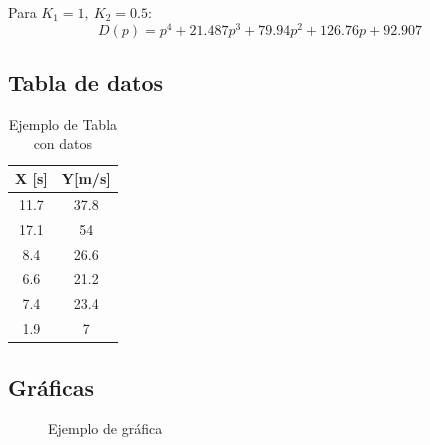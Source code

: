 \documentclass[article, 11pt]{IEEEtran}   %
\begin{document}
Para $K_1=1,\ K_2=0.5$:
\begin{equation*}
D(p)=p^4+21.487p^3+79.94p^2+126.76p+92.907
\end{equation*}


\subsection{Tabla de datos}
\begin{table}[H]
\centering
\caption{Ejemplo de Tabla con datos}
\label{DataTable1}
\begin{tabular}{|c|c|}
\hline
X [s] & Y[m/s]  \\
\hline
11.7 & 37.8              \\
17.1 & 54     \\  
8.4 & 26.6 \\
6.6 & 21.2 \\
7.4 & 23.4 \\
1.9 & 7   \\
\hline   
\end{tabular}
\end{table}

\subsection{Gr\'aficas}
\begin{figure}[H]
	\centering
	\caption{Ejemplo de gr\'afica}\label{diagram1}   %
\end{figure}
\end{document}
